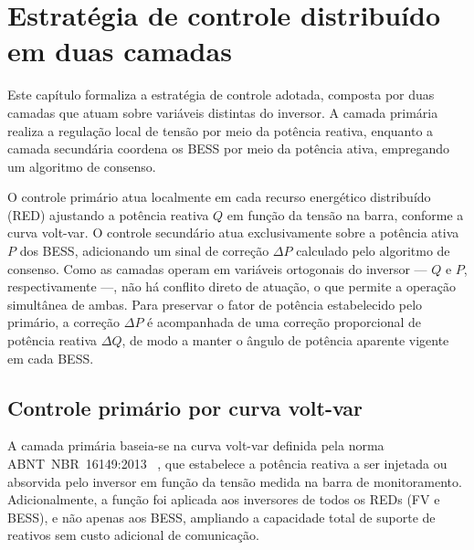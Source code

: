 \chapter{Estratégia de controle distribuído em duas camadas}
\label{cap:controle}

Este capítulo formaliza a estratégia de controle adotada, composta por duas camadas que atuam sobre variáveis distintas do inversor. A camada primária realiza a regulação local de tensão por meio da potência reativa, enquanto a camada secundária coordena os BESS por meio da potência ativa, empregando um algoritmo de consenso.


O controle primário atua localmente em cada recurso energético distribuído (RED) ajustando a potência reativa $Q$ em função da tensão na barra, conforme a curva volt-var. O controle secundário atua exclusivamente sobre a potência ativa $P$ dos BESS, adicionando um sinal de correção $\Delta P$ calculado pelo algoritmo de consenso. Como as camadas operam em variáveis ortogonais do inversor --- $Q$ e $P$, respectivamente ---, não há conflito direto de atuação, o que permite a operação simultânea de ambas. Para preservar o fator de potência estabelecido pelo primário, a correção $\Delta P$ é acompanhada de uma correção proporcional de potência reativa $\Delta Q$, de modo a manter o ângulo de potência aparente vigente em cada BESS.

\section{Controle primário por curva volt-var}
\label{sec:primario}

A camada primária baseia-se na curva volt-var definida pela norma ABNT~NBR~16149:2013~ \cite{nbr16149}, que estabelece a potência reativa a ser injetada ou absorvida pelo inversor em função da tensão medida na barra de monitoramento. Adicionalmente, a função foi aplicada aos inversores de todos os REDs (FV e BESS), e não apenas aos BESS, ampliando a capacidade total de suporte de reativos sem custo adicional de comunicação.

